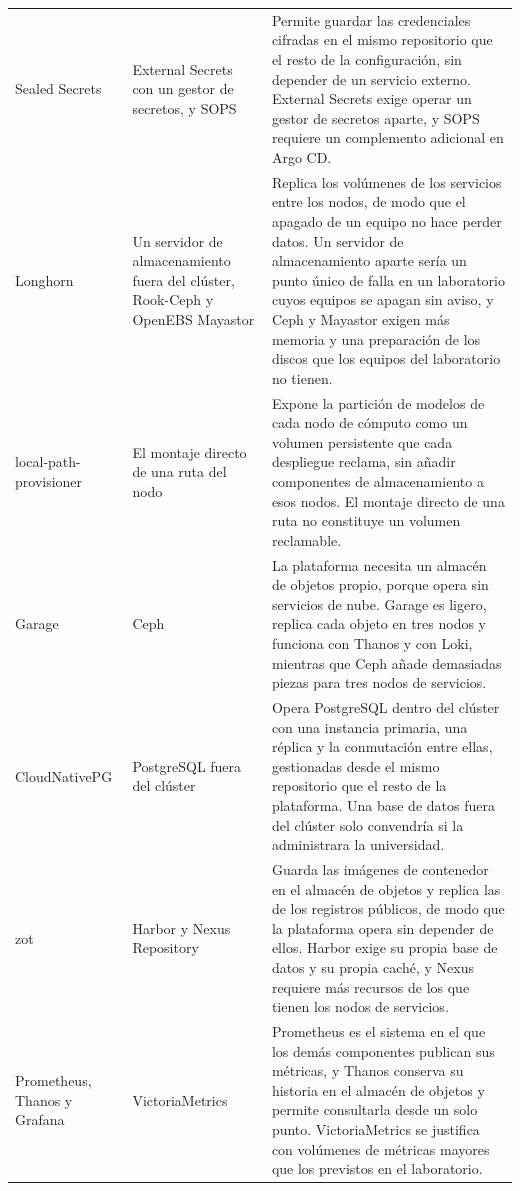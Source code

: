 {\begin{xltabular}{\textwidth}{>{\raggedright\arraybackslash}p{0.17\textwidth} >{\raggedright\arraybackslash}p{0.2\textwidth} >{\raggedright\arraybackslash}X}
    \addlinespace[4pt]
    Sealed Secrets & External Secrets con un gestor de secretos, y SOPS & Permite guardar las credenciales cifradas en el mismo repositorio que el resto de la configuración, sin depender de un servicio externo. External Secrets exige operar un gestor de secretos aparte, y SOPS requiere un complemento adicional en Argo CD. \\
    \addlinespace[4pt]
    Longhorn & Un servidor de almacenamiento fuera del clúster, Rook-Ceph y OpenEBS Mayastor & Replica los volúmenes de los servicios entre los nodos, de modo que el apagado de un equipo no hace perder datos. Un servidor de almacenamiento aparte sería un punto único de falla en un laboratorio cuyos equipos se apagan sin aviso, y Ceph y Mayastor exigen más memoria y una preparación de los discos que los equipos del laboratorio no tienen. \\
    \addlinespace[4pt]
    local-path-provisioner & El montaje directo de una ruta del nodo & Expone la partición de modelos de cada nodo de cómputo como un volumen persistente que cada despliegue reclama, sin añadir componentes de almacenamiento a esos nodos. El montaje directo de una ruta no constituye un volumen reclamable. \\
    \addlinespace[4pt]
    Garage & Ceph & La plataforma necesita un almacén de objetos propio, porque opera sin servicios de nube. Garage es ligero, replica cada objeto en tres nodos y funciona con Thanos y con Loki, mientras que Ceph añade demasiadas piezas para tres nodos de servicios. \\
    \addlinespace[4pt]
    CloudNativePG & PostgreSQL fuera del clúster & Opera PostgreSQL dentro del clúster con una instancia primaria, una réplica y la conmutación entre ellas, gestionadas desde el mismo repositorio que el resto de la plataforma. Una base de datos fuera del clúster solo convendría si la administrara la universidad. \\
    \addlinespace[4pt]
    zot & Harbor y Nexus Repository & Guarda las imágenes de contenedor en el almacén de objetos y replica las de los registros públicos, de modo que la plataforma opera sin depender de ellos. Harbor exige su propia base de datos y su propia caché, y Nexus requiere más recursos de los que tienen los nodos de servicios. \\
    \addlinespace[4pt]
    Prometheus, Thanos y Grafana & VictoriaMetrics & Prometheus es el sistema en el que los demás componentes publican sus métricas, y Thanos conserva su historia en el almacén de objetos y permite consultarla desde un solo punto. VictoriaMetrics se justifica con volúmenes de métricas mayores que los previstos en el laboratorio. \\

\end{xltabular}}

